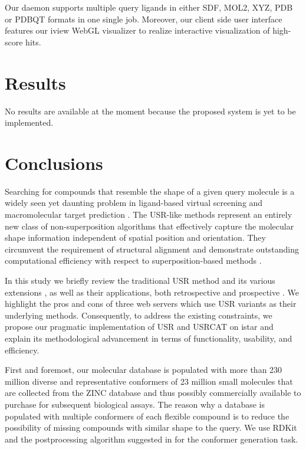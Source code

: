 Our daemon supports multiple query ligands in either SDF, MOL2, XYZ, PDB or PDBQT formats in one single job. Moreover, our client side user interface features our iview \citep{1366} WebGL visualizer to realize interactive visualization of high-score hits.

\section{Results}

No results are available at the moment because the proposed system is yet to be implemented.

\section{Conclusions}

Searching for compounds that resemble the shape of a given query molecule is a widely seen yet daunting problem in ligand-based virtual screening \citep{1332,1380} and macromolecular target prediction \citep{1407,1408,1402}. The USR-like methods \citep{1379,1338,1331} represent an entirely new class of non-superposition algorithms that effectively capture the molecular shape information independent of spatial position and orientation. They circumvent the requirement of structural alignment and demonstrate outstanding computational efficiency with respect to superposition-based methods \citep{1440,887,1439}.

In this study we briefly review the traditional USR method \citep{1379} and its various extensions \citep{1333,1436,1437,1334,1335,1337,1338,1331,1407,1408}, as well as their applications, both retrospective \citep{1332,1331} and prospective \citep{1380}. We highlight the pros and cons of three web servers \citep{1436,1437,1408} which use USR variants as their underlying methods. Consequently, to address the existing constraints, we propose our pragmatic implementation of USR \citep{1379} and USRCAT \citep{1331} on istar \citep{1362} and explain its methodological advancement in terms of functionality, usability, and efficiency.

First and foremost, our molecular database is populated with more than 230 million diverse and representative conformers of 23 million small molecules that are collected from the ZINC database \citep{532,1178} and thus possibly commercially available to purchase for subsequent biological assays. The reason why a database is populated with multiple conformers of each flexible compound is to reduce the possibility of missing compounds with similar shape to the query. We use RDKit and the postprocessing algorithm suggested in \citep{1127} for the conformer generation task.

